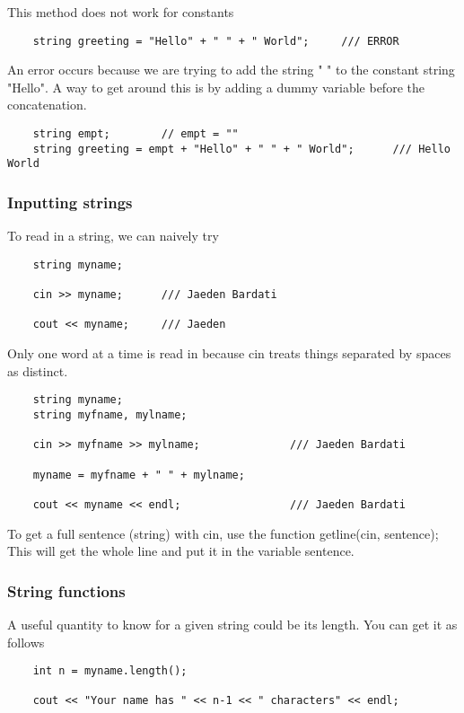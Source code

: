 \documentclass[]{article}
\begin{document}
This method does not work for constants
\begin{lstlisting}
	string greeting = "Hello" + " " + " World";		/// ERROR
\end{lstlisting}
\bigbreak

An error occurs because we are trying to add the string " " to the constant string "Hello". A way to get around this is by adding a dummy variable before the concatenation.
\begin{lstlisting}
	string empt; 		// empt = ""
	string greeting = empt + "Hello" + " " + " World";		/// Hello World
\end{lstlisting}

\subsubsection{Inputting strings}

To read in a string, we can naively try

\begin{lstlisting}
	string myname;
	
	cin >> myname;		/// Jaeden Bardati
	
	cout << myname;		/// Jaeden
\end{lstlisting}
\bigbreak

Only one word at a time is read in because cin treats things separated by spaces as distinct.

\begin{lstlisting}
	string myname;
	string myfname, mylname;
	
	cin >> myfname >> mylname;				/// Jaeden Bardati
	
	myname = myfname + " " + mylname;
	
	cout << myname << endl;					/// Jaeden Bardati
\end{lstlisting}

To get a full sentence (string) with cin, use the function getline(cin, sentence); This will get the whole line and put it in the  variable sentence.

\subsubsection{String functions}

A useful quantity to know for a given string could be its length. You can get it as follows

\begin{lstlisting}
	int n = myname.length();
	
	cout << "Your name has " << n-1 << " characters" << endl;
\end{lstlisting}
\bigbreak
\end{document}
